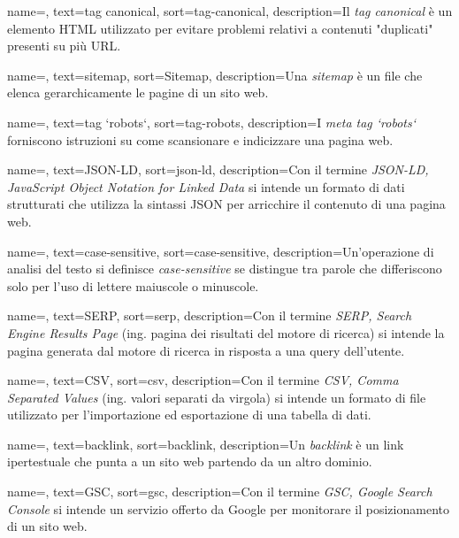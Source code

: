  {
    name=,
    text=tag canonical,
    sort=tag-canonical,
    description={Il \emph{tag canonical} è un elemento HTML utilizzato per evitare problemi relativi a contenuti "duplicati" presenti su più URL.}
}

 {
    name=,
    text=sitemap,
    sort=Sitemap,
    description={Una \emph{sitemap} è un file che elenca gerarchicamente le pagine di un sito web.}
}

 {
    name=,
    text=tag `robots`,
    sort=tag-robots,
    description={I \emph{meta tag `robots`} forniscono istruzioni su come scansionare e indicizzare una pagina web.}
}

 {
    name=,
    text=JSON-LD,
    sort=json-ld,
    description={Con il termine \emph{JSON-LD, JavaScript Object Notation for Linked Data} si intende un formato di dati strutturati che utilizza la sintassi JSON per arricchire il contenuto di una pagina web.}
}

 {
    name=,
    text=case-sensitive,
    sort=case-sensitive,
    description={Un'operazione di analisi del testo si definisce \emph{case-sensitive} se distingue tra parole che differiscono solo per l'uso di lettere maiuscole o minuscole.}
}

 {
    name=,
    text=SERP,
    sort=serp,
    description={Con il termine \emph{SERP, Search Engine Results Page} (ing. pagina dei risultati del motore di ricerca) si intende la pagina generata dal motore di ricerca in risposta a una query dell'utente.}
}

 {
    name=,
    text=CSV,
    sort=csv,
    description={Con il termine \emph{CSV, Comma Separated Values} (ing. valori separati da virgola) si intende un formato di file utilizzato per l'importazione ed esportazione di una tabella di dati.}
}

 {
    name=,
    text=backlink,
    sort=backlink,
    description={Un \emph{backlink} è un link ipertestuale che punta a un sito web partendo da un altro dominio.}
}

 {
    name=,
    text=GSC,
    sort=gsc,
    description={Con il termine \emph{GSC, Google Search Console} si intende un servizio offerto da Google per monitorare il posizionamento di un sito web.}
}

